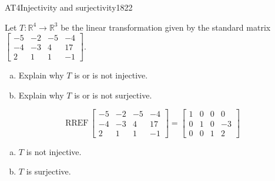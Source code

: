 \begin{exercise}{AT4}{Injectivity and surjectivity}{1822} 
\begin{exerciseStatement} 

 Let \(T:\mathbb{R}^4 \to \mathbb{R}^3\) be the linear transformation given by the standard matrix \(\left[\begin{array}{cccc}
-5 & -2 & -5 & -4 \\
-4 & -3 & 4 & 17 \\
2 & 1 & 1 & -1
\end{array}\right]\). 

 

\begin{enumerate}[(a)]
\item 

Explain why \(T\) is or is not injective.


\item 

Explain why \(T\) is or is not surjective.


\end{enumerate}

     \end{exerciseStatement}
 \begin{exerciseAnswer} 

\[\mathrm{RREF}\,\left[\begin{array}{cccc}
-5 & -2 & -5 & -4 \\
-4 & -3 & 4 & 17 \\
2 & 1 & 1 & -1
\end{array}\right]=\left[\begin{array}{cccc}
1 & 0 & 0 & 0 \\
0 & 1 & 0 & -3 \\
0 & 0 & 1 & 2
\end{array}\right]\]

 

\begin{enumerate}[(a)]
\item  

\(T\) is not injective.

 
\item  

\(T\) is surjective.

 
\end{enumerate}

     \end{exerciseAnswer}
 \end{exercise}


